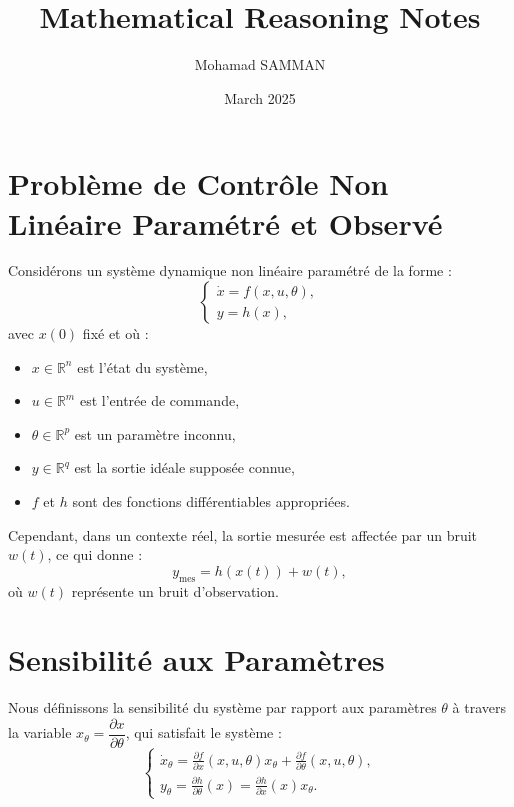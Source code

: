 \documentclass[a4paper]{article}
\title{Mathematical Reasoning Notes}
\author{Mohamad SAMMAN}
\date{March 2025}
\theoremstyle{definition}
\theoremstyle{remark}
\begin{document}
\maketitle

\section{Problème de Contrôle Non Linéaire Paramétré et Observé}

Considérons un système dynamique non linéaire paramétré de la forme :
\begin{equation}
    \begin{cases}
        \dot{x} = f(x, u, \theta), \\
        y = h(x),
    \end{cases}
\end{equation}
avec $ x(0) $ fixé et où :
\begin{itemize}
    \item $ x \in \mathbb{R}^n $ est l'état du système,
    \item $ u \in \mathbb{R}^m $ est l'entrée de commande,
    \item $ \theta \in \mathbb{R}^p $ est un paramètre inconnu,
    \item $ y \in \mathbb{R}^q $ est la sortie idéale supposée connue,
    \item $ f $ et $ h $ sont des fonctions différentiables appropriées.
\end{itemize}

Cependant, dans un contexte réel, la sortie mesurée est affectée par un bruit $ w(t) $, ce qui donne :
\begin{equation}
    y_{\text{mes}} = h(x(t)) + w(t),
\end{equation}
où $ w(t) $ représente un bruit d'observation.

\section{Sensibilité aux Paramètres}

Nous définissons la sensibilité du système par rapport aux paramètres $\theta$ à travers la variable $ x_{\theta} = \dfrac{\partial x}{\partial \theta} $, qui satisfait le système :
\begin{equation}
    \begin{cases}
        \dot{x}_{\theta} = \frac{\partial f}{\partial x} (x, u, \theta) x_{\theta} + \frac{\partial f}{\partial \theta} (x, u, \theta), \\
        y_{\theta} = \frac{\partial h}{\partial \theta} (x) = \frac{\partial h}{\partial x} (x) x_{\theta}.
    \end{cases}
\end{equation}
\end{document}
